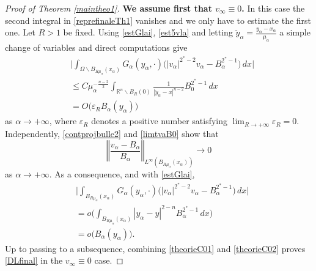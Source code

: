 \documentclass[10pt]{amsart}
\numberwithin{equation}{section}
\newcommand{\R}{\mathbb{R}}
\newcommand{\ve}{\varepsilon}
\newcommand{\Om}{\Omega}
\newcommand{\ma}{\mu_\alpha}
\def \ma{\mu_{\alpha}}
\theoremstyle{plain}
\theoremstyle{remark}
\begin{document}
\begin{proof}[Proof of Theorem \ref{maintheo1}]
\textbf{We assume first that $v_\infty \equiv 0$.} In this case the second integral in \eqref{reprefinaleTh1} vanishes and we only have to estimate the first one. Let $R >1$ be fixed. Using \eqref{estGlai}, \eqref{est5vla} and letting $\check{y}_\alpha = \frac{y_\alpha - x_\alpha}{\ma}$ a simple change of variables and direct computations give 
\begin{equation} \label{theorieC01} 
\begin{aligned} 
&\Big|\int_{\Om \backslash B_{R \ma}(x_\alpha)} G_\alpha(y_\alpha, \cdot)\Big( |v_\alpha|^{2^*-2} v_\alpha - B_\alpha^{2^*-1}  \Big)\, dx \Big|\\
&  \le C \ma^{-\frac{n-2}{2}} \int_{\R^n \backslash B_R(0)} \frac{1}{|\check{y}_\alpha-x|^{n-2}} B_0^{2^*-1} \, dx \\
& = O\big( \ve_R B_\alpha(y_\alpha) \big)
\end{aligned} 
\end{equation} 
as $\alpha \to + \infty$, where $\ve_R$ denotes a positive number satisfying $\lim_{R \to + \infty} \ve_R = 0$. Independently,  \eqref{contprojbulle2} and \eqref{limtvaB0} show that 
$$ \left \Vert \frac{v_\alpha - B_\alpha}{B_\alpha} \right \Vert_{L^\infty(B_{R\ma}(x_\alpha))} \to 0 $$
as $\alpha \to + \infty$. As a consequence, and with \eqref{estGlai},
\begin{equation} \label{theorieC02}
 \begin{aligned}
&\Big| \int_{B_{R \ma}(x_\alpha)} G_\alpha(y_\alpha, \cdot)\Big( |v_\alpha|^{2^*-2} v_\alpha - B_\alpha^{2^*-1}  \Big)\, dx \Big| \\
&  = o \Big( \int_{B_{R \ma}(x_\alpha)}  |y_\alpha-y|^{2-n} B_\alpha^{2^*-1}\, dx \Big)\\
& = o \big( B_\alpha(y_\alpha) \big). 
\end{aligned} \end{equation}
Up to passing to a subsequence, combining \eqref{theorieC01} and \eqref{theorieC02} proves \eqref{DLfinal} in the $v_\infty \equiv 0$ case. 

\medskip


\end{proof}
\end{document}

